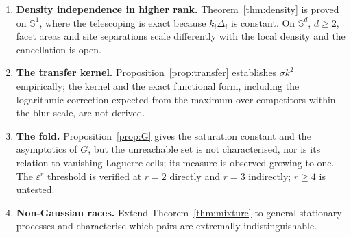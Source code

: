 \documentclass[11pt]{article}
\theoremstyle{definition}
\newcommand{\Sph}{\mathbb{S}}
\begin{document}
\begin{enumerate}
\item \textbf{Density independence in higher rank.} Theorem~\ref{thm:density}
is proved on $\Sph^{1}$, where the telescoping is exact because
$k_{i}\Delta_{i}$ is constant. On $\Sph^{d}$, $d\ge2$, facet areas and site
separations scale differently with the local density and the cancellation is
open.
\item \textbf{The transfer kernel.} Proposition~\ref{prop:transfer} establishes
$\sigma k^{2}$ empirically; the kernel and the exact functional form,
including the logarithmic correction expected from the maximum over
competitors within the blur scale, are not derived.
\item \textbf{The fold.} Proposition~\ref{prop:G} gives the saturation constant
and the asymptotics of $G$, but the unreachable set is not characterised, nor
is its relation to vanishing Laguerre cells; its measure is observed growing
to one. The $\varepsilon^{r}$ threshold is verified at $r=2$
directly and $r=3$ indirectly; $r\ge4$ is untested.
\item \textbf{Non-Gaussian races.} Extend Theorem~\ref{thm:mixture} to general
stationary processes and characterise which pairs are extremally
indistinguishable.
\end{enumerate}
\end{document}
